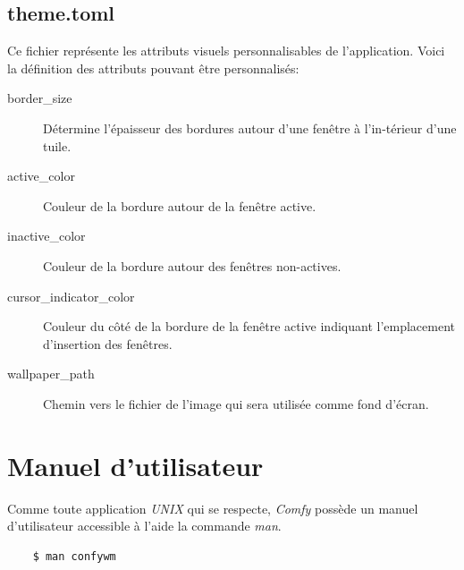 \documentclass[titlepage]{article}
\begin{document}
\subsection{theme.toml}
\begin{minipage}{\linewidth}
	
\end{minipage}

\par
Ce fichier représente les attributs visuels personnalisables de l'application. Voici la définition des attributs pouvant être personnalisés:
\begin{description}
	\item [border\_size] Détermine l'épaisseur des bordures autour d'une fenêtre à l'in-térieur d'une tuile.
	\item [active\_color] Couleur de la bordure autour de la fenêtre active.
	\item [inactive\_color] Couleur de la bordure autour des fenêtres non-actives.
	\item [cursor\_indicator\_color] Couleur du côté de la bordure de la fenêtre active indiquant l'emplacement d'insertion des fenêtres.
	\item [wallpaper\_path] Chemin vers le fichier de l'image qui sera utilisée comme fond d'écran.
\end{description}

\section{Manuel d'utilisateur}
Comme toute application \textit{UNIX} qui se respecte, \textit{Comfy} possède un manuel d'utilisateur accessible à l'aide la commande \textit{man}.

\begin{verbatim}
	$ man confywm
\end{verbatim}
\end{document}
